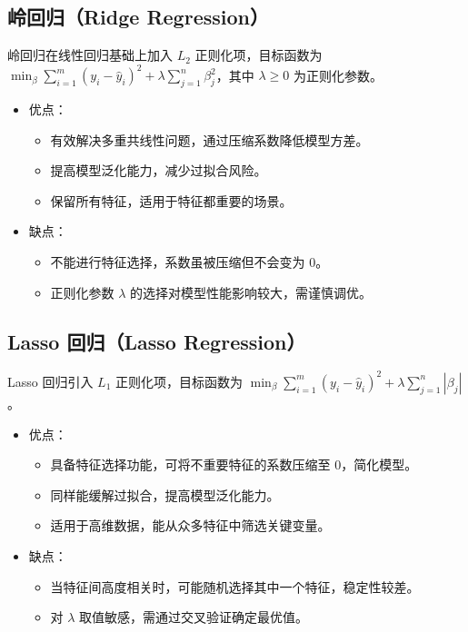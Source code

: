 \subsection{岭回归（Ridge Regression）}
岭回归在线性回归基础上加入 $L_2$ 正则化项，目标函数为 $\min_\beta \sum_{i=1}^m (y_i - \hat{y}_i)^2 + \lambda\sum_{j=1}^n \beta_j^2$，其中 $\lambda \geq 0$ 为正则化参数。

\begin{itemize}
    \item 优点：
    \begin{itemize}
        \item 有效解决多重共线性问题，通过压缩系数降低模型方差。
        \item 提高模型泛化能力，减少过拟合风险。
        \item 保留所有特征，适用于特征都重要的场景。
    \end{itemize}
    \item 缺点：
    \begin{itemize}
        \item 不能进行特征选择，系数虽被压缩但不会变为 0。
        \item 正则化参数 $\lambda$ 的选择对模型性能影响较大，需谨慎调优。
    \end{itemize}
\end{itemize}

\subsection{Lasso 回归（Lasso Regression）}
Lasso 回归引入 $L_1$ 正则化项，目标函数为 $\min_\beta \sum_{i=1}^m (y_i - \hat{y}_i)^2 + \lambda\sum_{j=1}^n |\beta_j|$。

\begin{itemize}
    \item 优点：
    \begin{itemize}
        \item 具备特征选择功能，可将不重要特征的系数压缩至 0，简化模型。
        \item 同样能缓解过拟合，提高模型泛化能力。
        \item 适用于高维数据，能从众多特征中筛选关键变量。
    \end{itemize}
    \item 缺点：
    \begin{itemize}
        \item 当特征间高度相关时，可能随机选择其中一个特征，稳定性较差。
        \item 对 $\lambda$ 取值敏感，需通过交叉验证确定最优值。
    \end{itemize}
\end{itemize}

